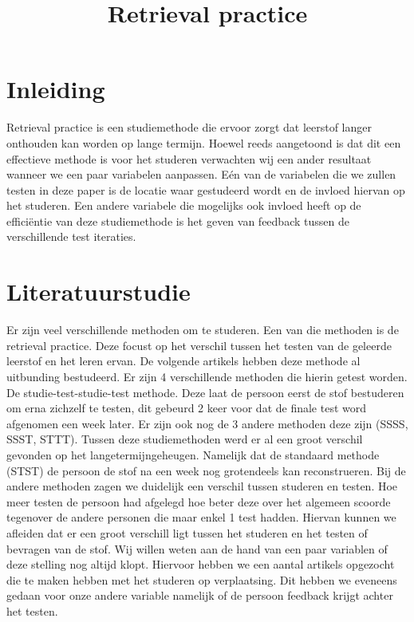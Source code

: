 \documentclass{hogent-article}
\affiliation{
	\textsuperscript{1} \href{mailto:Olivier.troch.w2257@student.hogent.be}{Olivier.troch.w2257@student.hogent.be}
}
\affiliation{
	\textsuperscript{2} \href{mailto:daan.vanvooren.y1502@student.hogent.be}{daan.vanvooren.y1502@student.hogent.be}
}
\affiliation{
	\textsuperscript{3}
	\href{mailto:robbie.verdurme.y9234@student.hogent.be}{robbie.verdurme.y9234@student.hogent.be}
}
\affiliation{
	\textsuperscript{4}
	\href{mailto;sebastien.wojtyla.y3274@student.hogent.be}{sebastien.wojtyla.y3274@student.hogent.be}
}
\begin{document}
	
	\flushbottom %
	\maketitle %
	\tableofcontents %
	\thispagestyle{empty} %
	
	
	\section{Inleiding}
	Retrieval practice is een studiemethode die ervoor zorgt dat leerstof langer onthouden kan worden op lange termijn. Hoewel reeds aangetoond is dat dit een effectieve methode is voor het studeren verwachten wij een ander resultaat wanneer we een paar variabelen aanpassen. Eén van de variabelen die we zullen testen in deze paper is de locatie waar gestudeerd wordt en de invloed hiervan op het studeren. 
	Een andere variabele die mogelijks ook invloed heeft op de efficiëntie van deze studiemethode is het geven van feedback tussen de verschillende test iteraties.
	
	\section{Literatuurstudie}
	\title{Retrieval practice}
	Er zijn veel verschillende methoden om te studeren. Een van die methoden is de retrieval practice. Deze focust op het verschil tussen het testen van de geleerde leerstof en het leren ervan.
	De volgende artikels \autocite{butler2010repeated, pyc2012test, karpicke2007repeated, karpicke2008critical} hebben deze methode al uitbunding bestudeerd. Er zijn 4 verschillende methoden die hierin getest worden. De studie-test-studie-test methode. Deze laat de persoon eerst de stof bestuderen om erna zichzelf te testen, dit gebeurd 2 keer voor dat de finale test word afgenomen een week later. Er zijn ook nog de 3 andere methoden deze zijn (SSSS, SSST, STTT).
	Tussen deze studiemethoden werd er al een groot verschil gevonden op het langetermijngeheugen. Namelijk dat de standaard methode (STST) de persoon de stof na een week nog grotendeels kan reconstrueren. Bij de andere methoden zagen we duidelijk een verschil tussen studeren en testen. Hoe meer testen de persoon had afgelegd hoe beter deze over het algemeen scoorde tegenover de andere personen die maar enkel 1 test hadden. Hiervan kunnen we afleiden dat er een groot verschill ligt tussen het studeren en het testen of bevragen van de stof.
	Wij willen weten aan de hand van een paar variablen of deze stelling nog altijd klopt. Hiervoor hebben we een aantal artikels opgezocht die te maken hebben met het studeren op verplaatsing. Dit hebben we eveneens gedaan voor onze andere variable namelijk of de persoon feedback krijgt achter het testen.
    
\end{document}
